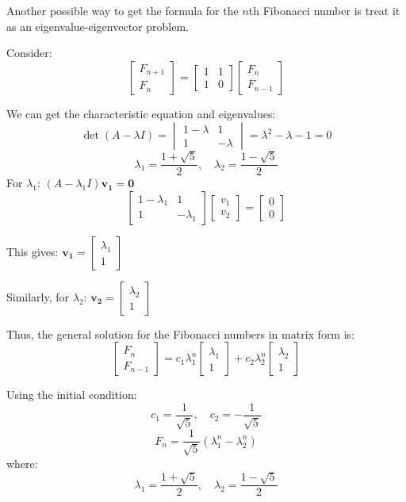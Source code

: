 \documentclass[12pt,a4paper]{article}
\begin{document}
\begin{solution}
\begin{remark}
Another possible way to get the formula for the $n$th Fibonacci number is treat it as an eigenvalue-eigenvector problem.

Consider:
\[
 \begin{bmatrix} F_{n+1} \\ F_n \end{bmatrix} = 
   \begin{bmatrix} 1 & 1 \\ 1 & 0 \end{bmatrix}
   \begin{bmatrix} F_n \\ F_{n-1} \end{bmatrix}
\]

We can get the characteristic equation and eigenvalues:
\[\det(A - \lambda I) = \begin{vmatrix} 1-\lambda & 1 \\ 1 & -\lambda \end{vmatrix} = \lambda^2 - \lambda - 1 = 0
\]
\[
\lambda_1 = \frac{1 + \sqrt{5}}{2}, \quad \lambda_2 = \frac{1 - \sqrt{5}}{2}
\]
For $\lambda_1$: $(A - \lambda_1 I)\mathbf{v_1} = \mathbf{0}$
   \[\begin{bmatrix} 1-\lambda_1 & 1 \\ 1 & -\lambda_1 \end{bmatrix}\begin{bmatrix} v_1 \\ v_2 \end{bmatrix} = \begin{bmatrix} 0 \\ 0 \end{bmatrix}\]
   
   This gives: $\mathbf{v_1} = \begin{bmatrix} \lambda_1 \\ 1 \end{bmatrix}$

   Similarly, for $\lambda_2$: $\mathbf{v_2} = \begin{bmatrix} \lambda_2 \\ 1 \end{bmatrix}$
   
Thus, the general solution for the Fibonacci numbers in matrix form is:
\[
\begin{bmatrix} F_n \\ F_{n-1} \end{bmatrix} = c_1 \lambda_1^n \begin{bmatrix} \lambda_1 \\ 1 \end{bmatrix} + c_2 \lambda_2^n \begin{bmatrix} \lambda_2 \\ 1 \end{bmatrix}
\]

Using the initial condition:
\[
c_1 = \frac{1}{\sqrt{5}}, \quad c_2 = -\frac{1}{\sqrt{5}}
\]
\[
F_n = \frac{1}{\sqrt{5}} \left( \lambda_1^n - \lambda_2^n \right)
\]
where:
\[
\lambda_1 = \frac{1 + \sqrt{5}}{2}, \quad \lambda_2 = \frac{1 - \sqrt{5}}{2}
\]
\end{remark}
\end{solution}
\end{document}
